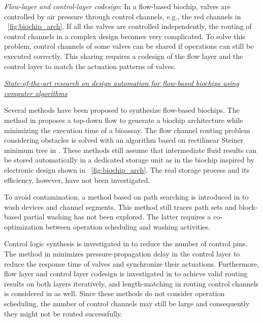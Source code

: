 \textit{Flow-layer and control-layer codesign}: In a flow-based biochip,
valves are controlled by air pressure through control channels, e.g., the red
channels in \figname~\ref{fig:biochip_arch}. If all the valves are controlled
independently, the routing of control channels in a complex design 
becomes very complicated.
To solve this problem, control channels of some valves can be shared if
operations can still be executed correctly. This sharing requires a codesign
of the flow layer and the control layer to match the actuation patterns of 
valves.

\vskip 8pt
\textit{\underline{State-of-the-art research on design automation for
flow-based biochips using computer algorithms}}

Several methods have been proposed to synthesize 
flow-based biochips. The method in \cite{MinhassPMB12} proposes a top-down
flow to generate a biochip architecture while minimizing the execution time of
a bioassay. The flow channel routing problem considering obstacles 
is solved  with an algorithm based on rectilinear Steiner minimum tree
in \cite{LinLCLH14}.
These methods
still assume that intermediate fluid results can be stored automatically in a dedicated storage
unit as in the biochip 
inspired by electronic design 
shown 
in \figname~\ref{fig:biochip_arch}. The real storage
process and its efficiency, however, have not been investigated.

To avoid contamination, a method based on path searching 
is introduced in  \cite{HuHC16} to wash devices and channel segments. This method 
still traces path sets and block-based partial washing has not been
explored. The latter requires a co-optimization between operation scheduling
and washing activities.

Control logic synthesis is investigated in \cite{MinhassPMH13}
to reduce the number of control pins. The method 
in \cite{HuDHC17} minimizes
pressure-propagation delay in the control layer to reduce the response
time of valves and synchronize their actuations.
Furthermore, flow layer and control layer codesign is investigated in
\cite{YaoWRCH15} to achieve valid routing results on both layers iteratively, and
length-matching in routing control channels is considered in \cite{YaoHC15} as
well. Since these methods 
do not consider operation scheduling, %
the number of control
channels may still be large and consequently they might not be routed successfully.   

